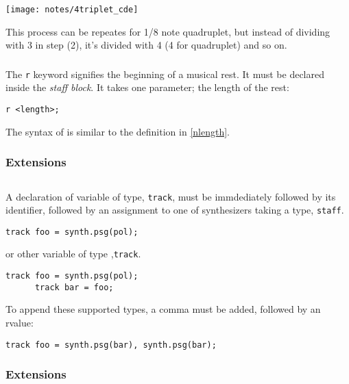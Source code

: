 \begin{center}
\texttt{[image: notes/4triplet\_cde]}
\end{center}

This process can be repeates for 1/8 note quadruplet, but instead of dividing
with 3 in step (2), it's divided with 4 (4 for quadruplet) and so on.


\subsubsection{}

\np The \verb+r+ keyword signifies the beginning of a musical rest. It must be
declared inside the \textit{staff block}. It takes one parameter; the
length of the rest:

\begin{Verbatim}[frame=single]
      r <length>;
\end{Verbatim}

\np The syntax of  is similar to the definition in 
\autoref{nlength}.

\subsubsection{Extensions}

\subsection{}
\np A declaration of variable of type,
\verb+track+, must be immdediately followed by its identifier, followed by
an assignment to one of synthesizers taking a type, \verb+staff+. 
\begin{Verbatim}[frame=single]
       track foo = synth.psg(pol);
\end{Verbatim}

or other variable of type ,\verb+track+.
\begin{Verbatim}[frame=single]
      track foo = synth.psg(pol);
      track bar = foo;
\end{Verbatim}

\np To append these supported types, a comma must be added, followed by an rvalue:
\begin{Verbatim}[frame=single]
      track foo = synth.psg(bar), synth.psg(bar);
\end{Verbatim}


\subsubsection{Extensions}

